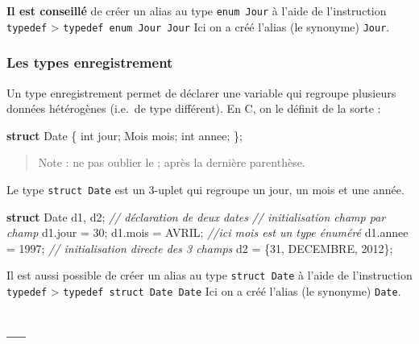 \documentclass[11pt]{article}
\newenvironment{Shaded}{}{}
\newcommand{\KeywordTok}[1]{\textcolor[rgb]{0.00,0.44,0.13}{\textbf{{#1}}}}
\newcommand{\DataTypeTok}[1]{\textcolor[rgb]{0.56,0.13,0.00}{{#1}}}
\newcommand{\DecValTok}[1]{\textcolor[rgb]{0.25,0.63,0.44}{{#1}}}
\newcommand{\CommentTok}[1]{\textcolor[rgb]{0.38,0.63,0.69}{\textit{{#1}}}}
\newcommand{\NormalTok}[1]{{#1}}
\begin{document}
\textbf{Il est conseillé} de créer un alias au type \texttt{enum\ Jour}
à l'aide de l'instruction \texttt{typedef} \textgreater{}
\texttt{typedef\ enum\ Jour\ Jour} Ici on a créé l'alias (le synonyme)
\texttt{Jour}.

    \hypertarget{les-types-enregistrement}{%
\subsubsection{Les types
enregistrement}\label{les-types-enregistrement}}

Un type enregistrement permet de déclarer une variable qui regroupe
plusieurs données hétérogènes (i.e.~de type différent). En C, on le
définit de la sorte :

\begin{Shaded}
\begin{Highlighting}[]
\KeywordTok{struct}\NormalTok{ Date \{}
    \DataTypeTok{int}\NormalTok{ jour;}
\NormalTok{    Mois mois;}
    \DataTypeTok{int}\NormalTok{ annee;}
\NormalTok{\};}
\end{Highlighting}
\end{Shaded}

\begin{quote}
Note : ne pas oublier le ; après la dernière parenthèse.
\end{quote}

Le type \texttt{struct\ Date} est un 3-uplet qui regroupe un jour, un
mois et une année.

\begin{Shaded}
\begin{Highlighting}[]
    \KeywordTok{struct}\NormalTok{ Date d1, d2;  }\CommentTok{// déclaration de deux dates}
    \CommentTok{// initialisation champ par champ}
\NormalTok{    d1.jour = }\DecValTok{30}\NormalTok{;}
\NormalTok{    d1.mois = AVRIL; }\CommentTok{//ici mois est un type énuméré}
\NormalTok{    d1.annee = }\DecValTok{1997}\NormalTok{;}
    \CommentTok{// initialisation directe des 3 champs}
\NormalTok{    d2 = \{}\DecValTok{31}\NormalTok{, DECEMBRE, }\DecValTok{2012}\NormalTok{\};}
\end{Highlighting}
\end{Shaded}

Il est aussi possible de créer un alias au type \texttt{struct\ Date} à
l'aide de l'instruction \texttt{typedef} \textgreater{}
\texttt{typedef\ struct\ Date\ Date} Ici on a créé l'alias (le synonyme)
\texttt{Date}.

    \hypertarget{section}{%
\subsection{---}\label{section}}
\end{document}
